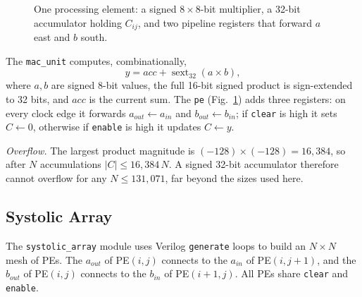 \documentclass[conference,a4paper]{IEEEtran}
\begin{document}
\begin{figure}[t]
\centering
\resizebox{0.92\columnwidth}{!}{}
\caption{One processing element: a signed $8\times8$-bit multiplier, a 32-bit accumulator holding $C_{ij}$, and two pipeline registers that forward $a$ east and $b$ south.}
\label{fig:pe}
\end{figure}

The \texttt{mac\_unit} computes, combinationally,
\begin{equation}
y = acc + \operatorname{sext}_{32}(a \times b),
\end{equation}
where $a, b$ are signed 8-bit values, the full 16-bit signed product is sign-extended to 32 bits, and $acc$ is the current sum. The \texttt{pe} (Fig.~\ref{fig:pe}) adds three registers: on every clock edge it forwards $a_{out} \leftarrow a_{in}$ and $b_{out} \leftarrow b_{in}$; if \texttt{clear} is high it sets $C \leftarrow 0$, otherwise if \texttt{enable} is high it updates $C \leftarrow y$.

\emph{Overflow.} The largest product magnitude is $(-128)\times(-128) = 16{,}384$, so after $N$ accumulations $|C| \le 16{,}384\,N$. A signed 32-bit accumulator therefore cannot overflow for any $N \le 131{,}071$, far beyond the sizes used here.

\subsection{Systolic Array}
The \texttt{systolic\_array} module uses Verilog \texttt{generate} loops to build an $N\times N$ mesh of PEs. The $a_{out}$ of PE$(i,j)$ connects to the $a_{in}$ of PE$(i,j{+}1)$, and the $b_{out}$ of PE$(i,j)$ connects to the $b_{in}$ of PE$(i{+}1,j)$. All PEs share \texttt{clear} and \texttt{enable}.
\end{document}

